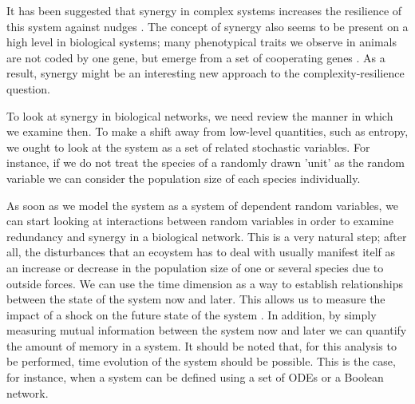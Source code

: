 \documentclass[../main.tex]{subfiles}
\begin{document}
It has been suggested that synergy in complex systems increases the resilience of this system against nudges \cite{quax2017quantifying}.
The concept of synergy also seems to be present on a high level in biological systems; many phenotypical traits we observe in animals are not coded by one gene, but emerge from a set of cooperating genes \cite{griffith2014quantifying}.
As a result, synergy might be an interesting new approach to the complexity-resilience question.

To look at synergy in biological networks, we need review the manner in which we examine then.
To make a shift away from low-level quantities, such as entropy, we ought to look at the system as a set of related stochastic variables.
For instance, if we do not treat the species of a randomly drawn 'unit' as the random variable we can consider the population size of each species individually.

As soon as we model the system as a system of dependent random variables, we can start looking at interactions between random variables in order to examine redundancy and synergy in a biological network.
This is a very natural step; after all, the disturbances that an ecoystem has to deal with usually manifest itelf as an increase or decrease in the population size of one or several species due to outside forces.
We can use the time dimension as a way to establish relationships between the state of the system now and later.
This allows us to measure the impact of a shock on the future state of the system \cite{QuaxPersonal}.
In addition, by simply measuring mutual information between the system now and later we can quantify the amount of memory in a system.
It should be noted that, for this analysis to be performed, time evolution of the system should be possible.
This is the case, for instance, when a system can be defined using a set of ODEs or a Boolean network.
\end{document}
